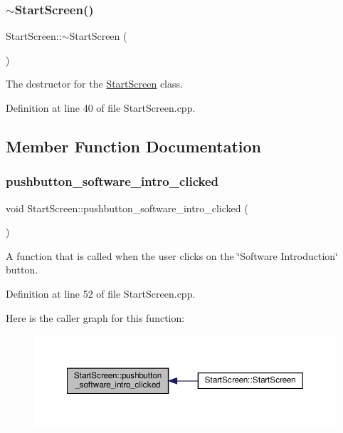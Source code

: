 \subsubsection{\texorpdfstring{$\sim$\+Start\+Screen()}{~StartScreen()}}
{\footnotesize\ttfamily Start\+Screen\+::$\sim$\+Start\+Screen (\begin{DoxyParamCaption}{ }\end{DoxyParamCaption})}

The destructor for the \hyperlink{class_start_screen}{Start\+Screen} class. 

Definition at line 40 of file Start\+Screen.\+cpp.



\subsection{Member Function Documentation}
\mbox{\label{class_start_screen_a46f7199921ac073d0601ba4ca92659c7}} 
\subsubsection{\texorpdfstring{pushbutton\+\_\+software\+\_\+intro\+\_\+clicked}{pushbutton\_software\_intro\_clicked}}
{\footnotesize\ttfamily void Start\+Screen\+::pushbutton\+\_\+software\+\_\+intro\+\_\+clicked (\begin{DoxyParamCaption}{ }\end{DoxyParamCaption})\hspace{0.3cm}{\ttfamily [slot]}}

A function that is called when the user clicks on the \char`\"{}\+Software Introduction\char`\"{} button. 

Definition at line 52 of file Start\+Screen.\+cpp.

Here is the caller graph for this function\+:
\nopagebreak
\begin{figure}[H]
\begin{center}
\leavevmode
\includegraphics[width=350pt]{class_start_screen_a46f7199921ac073d0601ba4ca92659c7_icgraph}
\end{center}
\end{figure}
\mbox{\label{class_start_screen_a8343a5d292a0361ae1a760ff109f5740}} 
